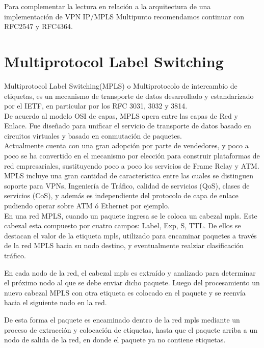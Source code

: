 Para complementar la lectura en relaci\'on a la arquitectura de una implementaci\'on de VPN IP/MPLS Multipunto recomendamos continuar con RFC2547\citep{rosen1999bgp} y RFC4364\citep{rosen2006bgp}.

\section{Multiprotocol Label Switching}
\label{section2.8}

Multiprotocol Label Switching(MPLS) o Multiprotocolo de intercambio de etiquetas, es un mecanismo de transporte de datos desarrollado y estandarizado por el IETF, en particular por los RFC 3031\cite{rosen2001multiprotocol}, 3032\citep{rosen2001mpls} y 3814\citep{nadeau2004multiprotocol}.\\

De acuerdo al modelo OSI de capas, MPLS opera entre las capas de Red y Enlace. Fue diseñado para unificar el servicio de transporte de datos basado en circuitos virtuales y basado en conmutación de paquetes.\\

Actualmente cuenta con una gran adopción por parte de vendedores, y poco a poco se ha convertido en el mecanismo por elección para construir plataformas de red empresariales, sustituyendo poco a poco los servicios de Frame Relay y ATM.\\
 
MPLS incluye una gran cantidad de característica entre las cuales se distinguen soporte para VPNs, Ingeniería de Tráfico, calidad de servicios (QoS), clases de servicios (CoS), y además es independiente del protocolo de capa de enlace pudiendo operar sobre ATM ó Ethernet por ejemplo.\\

En una red MPLS, cuando un paquete ingresa se le coloca un cabezal mpls. Este cabezal esta compuesto por cuatro campos: Label, Exp, S, TTL. De ellos se destacan el valor de la etiqueta mpls, utilizado para encaminar paquetes a través de la red MPLS hacia su nodo destino, y eventualmente realziar clasificación tr\'afico.

En cada nodo de la red, el cabezal mpls es extraído y analizado para determinar el próximo nodo al que se debe enviar dicho paquete. Luego del procesamiento un nuevo cabezal MPLS con otra etiqueta es colocado en el paquete y se reenvía hacia el siguiente nodo en la red.

De esta forma el paquete es encaminado dentro de la red mpls mediante un proceso de extracción y colocación de etiquetas, hasta que el paquete arriba a un nodo de salida de la red, en donde el paquete ya no contiene etiquetas.\\

